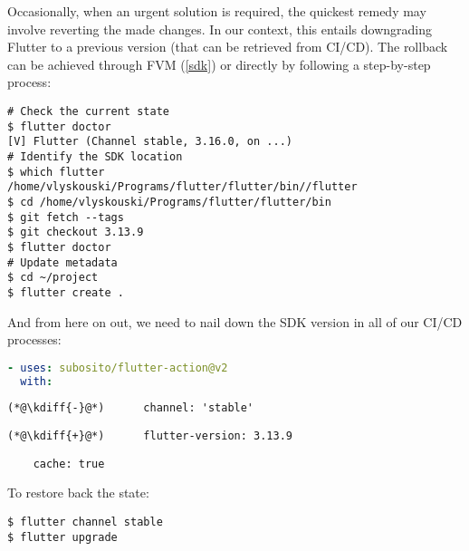 Occasionally, when an urgent solution is required, the quickest remedy may involve reverting  the made 
changes. In our context, this entails downgrading Flutter to a previous version (that can be retrieved from CI/CD). 
The rollback can be achieved through FVM (\ref{sdk}) or directly by following a step-by-step process:

\begin{lstlisting}[language=terminal]
# Check the current state
$ flutter doctor
[V] Flutter (Channel stable, 3.16.0, on ...)
# Identify the SDK location
$ which flutter
/home/vlyskouski/Programs/flutter/flutter/bin//flutter
$ cd /home/vlyskouski/Programs/flutter/flutter/bin
$ git fetch --tags
$ git checkout 3.13.9
$ flutter doctor
# Update metadata
$ cd ~/project
$ flutter create .
\end{lstlisting}

\noindent And from here on out, we need to nail down the SDK version in all of our CI/CD processes:

\begin{lstlisting}[language=yaml]
- uses: subosito/flutter-action@v2
  with:
\end{lstlisting}
{
\xpretocmd{\lstlisting}{\vspace{-12pt}}{}{}
\begin{lstlisting}[firstnumber=2, backgroundcolor=\color{backred}]
(*@\kdiff{-}@*)      channel: 'stable'
\end{lstlisting}
\begin{lstlisting}[firstnumber=2, backgroundcolor=\color{backgreen}]
(*@\kdiff{+}@*)      flutter-version: 3.13.9
\end{lstlisting}
\begin{lstlisting}
    cache: true
\end{lstlisting}
}

\noindent To restore back the state:

\begin{lstlisting}[language=terminal]
$ flutter channel stable
$ flutter upgrade
\end{lstlisting}
